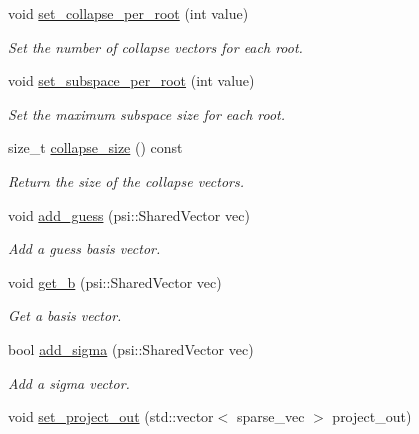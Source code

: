 \begin{DoxyCompactItemize}
void \mbox{\hyperlink{classforte_1_1_davidson_liu_solver_a7423d12c5300f050e6c0f09f314b08d1}{set\+\_\+collapse\+\_\+per\+\_\+root}} (int value)
\begin{DoxyCompactList}\small\item\em Set the number of collapse vectors for each root. \end{DoxyCompactList}\item 
void \mbox{\hyperlink{classforte_1_1_davidson_liu_solver_a0b09acd03c81aa259f22368af4ba422d}{set\+\_\+subspace\+\_\+per\+\_\+root}} (int value)
\begin{DoxyCompactList}\small\item\em Set the maximum subspace size for each root. \end{DoxyCompactList}\item 
size\+\_\+t \mbox{\hyperlink{classforte_1_1_davidson_liu_solver_af68b3caa5e37a93261b13cbdd7006ecf}{collapse\+\_\+size}} () const
\begin{DoxyCompactList}\small\item\em Return the size of the collapse vectors. \end{DoxyCompactList}\item 
void \mbox{\hyperlink{classforte_1_1_davidson_liu_solver_a16d9dda8f0ca73840539381caf50601d}{add\+\_\+guess}} (psi\+::\+Shared\+Vector vec)
\begin{DoxyCompactList}\small\item\em Add a guess basis vector. \end{DoxyCompactList}\item 
void \mbox{\hyperlink{classforte_1_1_davidson_liu_solver_ae3e3b9505b8ced3a1d2f2abeb9c5ba7d}{get\+\_\+b}} (psi\+::\+Shared\+Vector vec)
\begin{DoxyCompactList}\small\item\em Get a basis vector. \end{DoxyCompactList}\item 
bool \mbox{\hyperlink{classforte_1_1_davidson_liu_solver_a115e25576e4b15e960de1a7dba553079}{add\+\_\+sigma}} (psi\+::\+Shared\+Vector vec)
\begin{DoxyCompactList}\small\item\em Add a sigma vector. \end{DoxyCompactList}\item 
void \mbox{\hyperlink{classforte_1_1_davidson_liu_solver_a6e41d496aef9fa83c557b513b52e4d6f}{set\+\_\+project\+\_\+out}} (std\+::vector$<$ sparse\+\_\+vec $>$ project\+\_\+out)
\item 

\end{DoxyCompactItemize}
